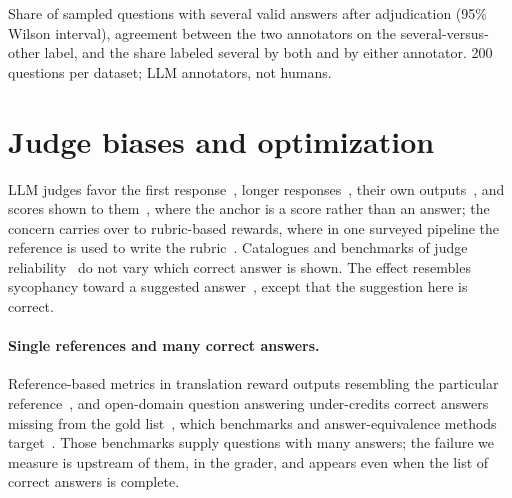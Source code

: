 \begin{table}[htbp]
\centering
\caption{Share of sampled questions with several valid answers after adjudication (95\% Wilson interval), agreement between the two annotators on the several-versus-other label, and the share labeled several by both and by either annotator. 200 questions per dataset; LLM annotators, not humans.\pre}
\label{tab:prevalence-v2}
\footnotesize
\begin{adjustbox}{max width=\linewidth}\end{adjustbox}
\end{table}

\FloatBarrier
\section{Judge biases and optimization}
\label{app:relatedbias}

LLM judges favor the first response~\citep{wang2024fair}, longer responses~\citep{dubois2024lengthcontrolled}, their own outputs~\citep{panickssery2024llm}, and scores shown to them~\citep{kapetanovic2026anchoring}, where the anchor is a score rather than an answer; the concern carries over to rubric-based rewards, where in one surveyed pipeline the reference is used to write the rubric~\citep{gunjal2025rar}. Catalogues and benchmarks of judge reliability~\citep{koo2024benchmarking,ye2025justice,tan2025judgebench} do not vary which correct answer is shown. The effect resembles sycophancy toward a suggested answer~\citep{sharma2023sycophancy,turpin2023unfaithful}, except that the suggestion here is correct.

\paragraph{Single references and many correct answers.}
Reference-based metrics in translation reward outputs resembling the particular reference~\citep{freitag2020bleu,fomicheva2016reference}, and open-domain question answering under-credits correct answers missing from the gold list~\citep{min2020ambigqa,si2021whatsinaname,bulian2022tomayto,kamalloo2023evaluating}, which benchmarks and answer-equivalence methods target~\citep{amouyal2022qampari,li2024pedants}. Those benchmarks supply questions with many answers; the failure we measure is upstream of them, in the grader, and appears even when the list of correct answers is complete.

